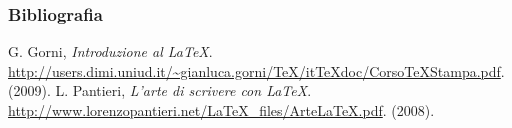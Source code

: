 \documentclass[leqno]{beamer}
\begin{document}
\begin{frame}
      \frametitle{Bibliografia}
      \begin{thebibliography}{introlatex}

	 G. Gorni, \emph{Introduzione al \LaTeX}.  \url{http://users.dimi.uniud.it/~gianluca.gorni/TeX/itTeXdoc/CorsoTeXStampa.pdf}. (2009).
	 L. Pantieri, \emph{L'arte di scrivere con \LaTeX}. \url{http://www.lorenzopantieri.net/LaTeX_files/ArteLaTeX.pdf}. (2008).
	
\end{thebibliography}

\end{frame}
\end{document}
